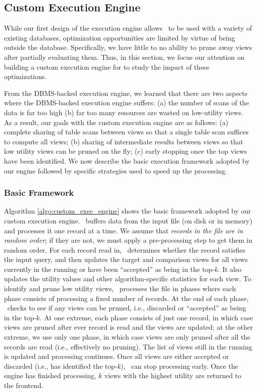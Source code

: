 

\subsection{Custom Execution Engine}
\label{sec:in_memory_execution_engine}

While our first design of the execution engine allows \VizRecDB\ to be
used with a variety of existing databases, optimization opportunities are
limited by virtue of being outside the database.
Specifically, we have little to no ability to prune away views
after partially evaluating them.
Thus, in this section, we focus our attention on building
a custom execution engine for \VizRecDB to study the impact of 
these optimizations.

From the DBMS-backed execution engine, 
we learned that there are two aspects where
the DBMS-backed execution engine suffers:
(a) the number of scans of the data is far too high
(b) far too many resources are wasted on low-utility views.
As a result, our goals with the custom execution engine are as follows:
(a) complete sharing of table scans between views so that a single table scan
suffices to compute all views; 
(b) sharing of intermediate results between views so that low utility views can
be pruned on the fly; 
(c) early stopping once the top views have been identified. 
We now describe the
basic execution framework adopted by our engine followed by specific strategies
used to speed up the processing.

\subsubsection{Basic Framework}
\label{subsec:basic_framework}
Algorithm \ref{algo:custom_exec_engine} shows the basic framework adopted by our
custom execution engine.
\VizRecDB\ buffers data from the input file (on disk or in memory) and processes it
one record at a time.
We assume that {\it records in the file are in random order}; if they are not,
we must apply a pre-processing step to get them in random order.
For each record read in, \VizRecDB\ determines whether the record satisfies the
input query, and then updates the target and comparison views for all views
currently in the running or have been ``accepted'' as being in the top-$k$.
It also updates the utility values and other algorithm-specific statistics for
each view.
To identify and prune low utility views, \VizRecDB\ processes the file in
phases where each phase consists of processing a fixed number of records.
At the end of each phase, \VizRecDB\ checks to see if any views can be pruned,
i.e., discarded or ``accepted'' as being in the top-$k$.
At one extreme, each phase consists of just one record, in which case views
are pruned after ever record is read and the views are updated;
at the other extreme, we use only one phase, in which case views are only pruned
after all the records are read (i.e., effectively no pruning). 
The list of views still in the running is updated and processing continues.
Once all views are either accepted or discarded (i.e.,
\VizRecDB has identified the top-$k$), \VizRecDB\ can stop processing early.
Once the engine has finished processing, $k$ views with the
highest utility are returned to the frontend.

